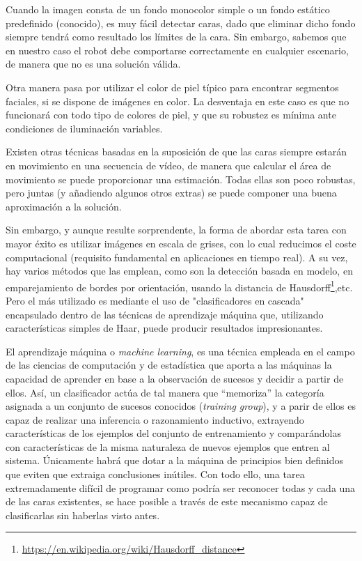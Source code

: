 Cuando la imagen consta de un fondo monocolor simple o un fondo estático predefinido (conocido), es muy fácil detectar caras, dado que eliminar dicho fondo siempre tendrá como resultado los límites de la cara. Sin embargo, sabemos que en nuestro caso el robot debe comportarse correctamente en cualquier escenario, de manera que no es una solución válida.

Otra manera pasa por utilizar el color de piel típico para encontrar segmentos faciales, si se dispone de imágenes en color. La desventaja en este caso es que no funcionará con todo tipo de colores de piel, y que su robustez es mínima ante condiciones de iluminación variables. 

Existen otras técnicas basadas en la suposición de que las caras siempre estarán en movimiento en una secuencia de vídeo, de manera que calcular el área de movimiento se puede proporcionar una estimación. Todas ellas son poco robustas, pero juntas (y añadiendo algunos otros extras) se puede componer una buena aproximación a la solución. 

Sin embargo, y aunque resulte sorprendente, la forma de abordar esta tarea con mayor éxito es utilizar imágenes en escala de grises, con lo cual reducimos el coste computacional (requisito fundamental en aplicaciones en tiempo real). A su vez, hay varios métodos que las emplean, como son la detección basada en modelo, en emparejamiento de bordes por orientación, usando la distancia de Hausdorff\footnote{\url{https://en.wikipedia.org/wiki/Hausdorff_distance}},etc. Pero el más utilizado es mediante el uso de "clasificadores en cascada" encapsulado dentro de las técnicas de aprendizaje máquina que, utilizando características simples de Haar, puede producir resultados impresionantes.

El aprendizaje máquina o \textit{machine learning}, es una técnica empleada en el campo de las ciencias de computación y de estadística que aporta a las máquinas la capacidad de aprender en base a la observación de sucesos y decidir a partir de ellos. Así, un clasificador actúa de tal manera que “memoriza” la categoría asignada a un conjunto de sucesos conocidos (\textit{training group}), y a parir de ellos es capaz de realizar una inferencia o razonamiento inductivo, extrayendo características de los ejemplos del conjunto de entrenamiento y comparándolas con características de la misma naturaleza de nuevos ejemplos que entren al sistema. Únicamente habrá que dotar a la máquina de principios bien definidos que eviten que extraiga conclusiones inútiles. Con todo ello, una tarea extremadamente difícil de programar como podría ser reconocer todas y cada una de las caras existentes, se hace posible a través de este mecanismo capaz de clasificarlas sin haberlas visto antes.

